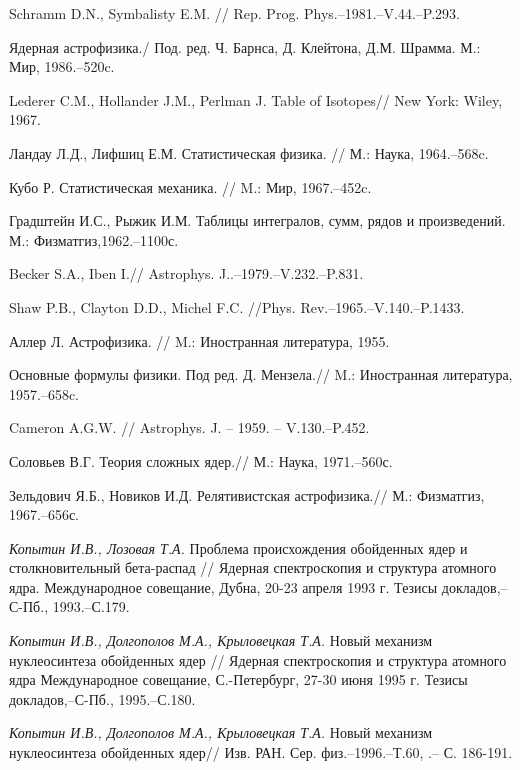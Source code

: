 \begin{thebibliography}{200}
Schramm D.N., Symbalisty E.M. // Rep. Prog. Phys.--1981.--V.44.--P.293.

Ядерная астрофизика./ Под. ред. Ч. Барнса, Д. Клейтона, Д.М. Шрамма. М.: Мир, 1986.--520c.

Lederer C.M., Hollander J.M., Perlman J. Table of Isotopes// New York: Wiley, 1967.

Ландау Л.Д., Лифшиц Е.М. Статистическая физика. // М.: Наука, 1964.--568c.

Кубо Р. Статистическая механика. // M.: Мир, 1967.--452c.

Градштейн И.С., Рыжик И.М. Таблицы интегралов, сумм, рядов и произведений.
М.: Физматгиз,1962.--1100с.


Becker S.A., Iben I.// Astrophys. J..--1979.--V.232.--P.831.

Shaw P.B., Clayton D.D., Michel F.C. //Phys. Rev.--1965.--V.140.--P.1433.


Аллер Л. Астрофизика. // M.: Иностранная литература, 1955.

Основные формулы физики. Под ред. Д. Мензела.// M.: Иностранная литература, 1957.--658c.


Cameron A.G.W. // Astrophys. J. -- 1959. -- V.130.--P.452.


Соловьев В.Г. Теория сложных ядер.// М.: Наука, 1971.--560с.

Зельдович Я.Б., Новиков И.Д. Релятивистская астрофизика.// М.: Физматгиз, 1967.--656с.


\textit{Копытин И.В., Лозовая Т.А.} Проблема происхождения обойденных ядер
и столкновительный бета-распад // Ядерная спектроскопия и структура
атомного ядра. Международное совещание, Дубна, 20-23 апреля
1993 г. Тезисы докладов,--С-Пб., 1993.--С.179.

\textit{Копытин И.В., Долгополов М.А., Крыловецкая Т.А.} Новый механизм
нуклеосинтеза обойденных ядер // Ядерная спектроскопия и структура
атомного ядра Международное совещание, С.-Петербург, 27-30
июня 1995 г. Тезисы докладов,--С-Пб., 1995.--С.180.

\textit{Копытин И.В., Долгополов М.А., Крыловецкая Т.А.} Новый механизм
нуклеосинтеза обойденных ядер// Изв. РАН. Сер. физ.--1996.--Т.60, .--
С. 186-191.


\end{thebibliography}
